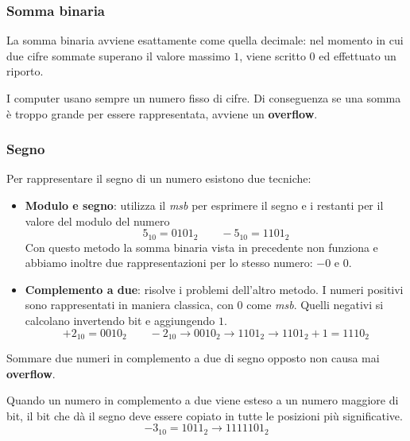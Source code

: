 \subsubsection{Somma binaria}
La somma binaria avviene esattamente come quella decimale: nel momento in cui due cifre sommate superano il valore massimo $1$, viene scritto $0$ ed effettuato un riporto.
\begin{observation}
	I computer usano sempre un numero fisso di cifre. Di conseguenza se una somma è troppo grande per essere rappresentata, avviene un \textbf{overflow}.
\end{observation}

\subsubsection{Segno}
Per rappresentare il segno di un numero esistono due tecniche:
\begin{itemize}
	\item \textbf{Modulo e segno}: utilizza il \textit{msb} per esprimere il segno e i restanti per il valore del modulo del numero
	\begin{equation*}
		5_{10} = 0101_{2} \quad\quad -5_{10} = 1101_{2}
	\end{equation*}
	Con questo metodo la somma binaria vista in precedente non funziona e abbiamo inoltre due rappresentazioni per lo stesso numero: $-0$ e $0$.
	\item \textbf{Complemento a due}: risolve i problemi dell'altro metodo. I numeri positivi sono rappresentati in maniera classica, con $0$ come \textit{msb}. Quelli negativi si calcolano invertendo bit e aggiungendo $1$.
	\begin{equation*}
		+2_{10} = 0010_2 \quad\quad -2_{10} \to 0010_2 \to 1101_2 \to 1101_2 + 1 = 1110_2
	\end{equation*}
\end{itemize}

\begin{observation}
	Sommare due numeri in complemento a due di segno opposto non causa mai \textbf{overflow}.
\end{observation}

\begin{proposition}
	Quando un numero in complemento a due viene esteso a un numero maggiore di bit, il bit che dà il segno deve essere copiato in tutte le posizioni più significative.
	\begin{equation*}
		-3_{10} = 1011_2 \longrightarrow 1111101_2
	\end{equation*}
\end{proposition}

